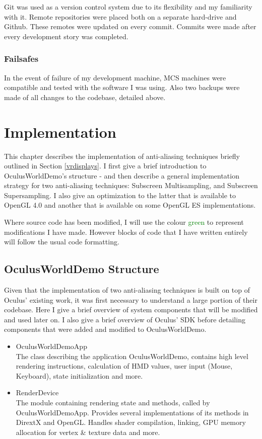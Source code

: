 \documentclass[12pt,a4paper,twoside,openright]{report}
\begin{document}
Git was used as a version control system due to its flexibility and my familiarity with it. Remote repositories were placed both on a separate hard-drive and Github. These remotes were updated on every commit. Commits were made after every development story was completed.

\subsection{Failsafes}

In the event of failure of my development machine, MCS machines were compatible and tested with the software I was using. Also two backups were made of all changes to the codebase, detailed above.

\chapter{Implementation}

This chapter describes the implementation of anti-aliasing techniques briefly outlined in Section \ref{vrdisplays}. I first give a brief introduction to OculusWorldDemo's structure - and then describe a general implementation strategy for two anti-aliasing techniques: Subscreen Multisampling, and Subscreen Supersampling. I also give an optimization to the latter that is available to OpenGL 4.0 and another that is available on some OpenGL ES implementations. 

Where source code has been modified, I will use the colour \textcolor{green}{green} to represent modifications I have made. However blocks of code that I have written entirely will follow the usual code formatting.

\section{OculusWorldDemo Structure}

Given that the implementation of two anti-aliasing techniques is built on top of Oculus' existing work, it was first necessary to understand a large portion of their codebase.
Here I give a brief overview of system components that will be modified and used later on. I also give a brief overview of Oculus' SDK before detailing components that were added and modified to OculusWorldDemo.

\begin{itemize}
\item OculusWorldDemoApp \\
  The class describing the application OculusWorldDemo, contains high level rendering instructions, calculation of HMD values, user input (Mouse, Keyboard), state initialization and more.

\item RenderDevice \\
  The module containing rendering state and methods, called by OculusWorldDemoApp. Provides several implementations of its methods in DirextX and OpenGL. Handles shader compilation, linking, GPU memory allocation for vertex \& texture data and more.

\end{itemize}
\end{document}
